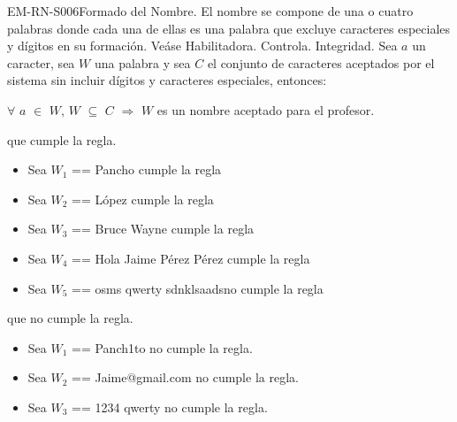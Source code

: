 \begin{BussinesRule}{EM-RN-S006}{Formado del Nombre.} 
	\BRitem[Descripción:] El nombre se compone de una o cuatro palabras donde cada una 
	de ellas es una palabra que excluye caracteres especiales y dígitos en su formación.
	Veáse 
	\BRitem[Tipo:] Habilitadora.
	\BRitem[Nivel:] Controla.
	\BRitem[Clase:] Integridad.
	\BRitem[Sentenia:] Sea $a$ un caracter, sea $W$ una palabra y sea $C$ el conjunto de caracteres
	aceptados por el sistema sin incluir dígitos y caracteres especiales, entonces:
	\begin{center}
		$\forall$ $a$ $\in$ $W$, $W$ $\subseteq$ $C$ $\Rightarrow$ $W$ es un nombre aceptado para el 
		profesor.
	\end{center}
	 que cumple la regla.
		\begin{itemize}
			\item Sea $W_{1}$ == Pancho cumple la regla
			\item Sea $W_{2}$ == López cumple la regla
			\item Sea $W_{3}$ == Bruce Wayne cumple la regla
			\item Sea $W_{4}$ == Hola Jaime Pérez Pérez cumple la regla
			\item Sea $W_{5}$ == osms qwerty sdnklsaadsno cumple la regla
		\end{itemize}
	 que no cumple la regla.
		\begin{itemize}
			\item Sea $W_{1}$ == Panch1to no cumple la regla.
			\item Sea $W_{2}$ == Jaime@gmail.com no cumple la regla.
			\item Sea $W_{3}$ == 1234 qwerty no cumple la regla.
		\end{itemize}
\end{BussinesRule}

